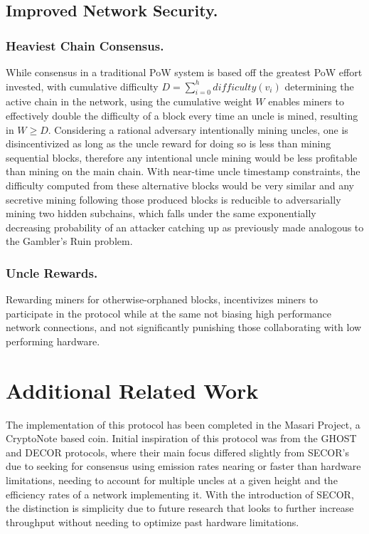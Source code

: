 \documentclass{article}
\begin{document}
\subsection{Improved Network Security.}
\subsubsection{Heaviest Chain Consensus.}
While consensus in a traditional PoW system is based off the greatest PoW effort invested, with cumulative difficulty $D = \sum_{i=0}^{h} difficulty(v_i)$ determining the active chain in the network, using the cumulative weight $W$ enables miners to effectively double the difficulty of a block every time an uncle is mined, resulting in $W \geq D$. Considering a rational adversary intentionally mining uncles, one is disincentivized as long as the uncle reward for doing so is less than mining sequential blocks, therefore any intentional uncle mining would be less profitable than mining on the main chain. With near-time uncle timestamp constraints, the difficulty computed from these alternative blocks would be very similar and any secretive mining following those produced blocks is reducible to adversarially mining two hidden subchains, which falls under the same exponentially decreasing probability of an attacker catching up as previously made analogous to the Gambler's Ruin problem\cite{nakamoto}.

\subsubsection{Uncle Rewards.}
Rewarding miners for otherwise-orphaned blocks, incentivizes miners to participate in the protocol while at the same not biasing high performance network connections, and not significantly punishing those collaborating with low performing hardware.

\section{Additional Related Work}
The implementation of this protocol has been completed in the Masari Project, a CryptoNote based coin. Initial inspiration of this protocol was from the GHOST and DECOR protocols, where their main focus differed slightly from SECOR's due to seeking for consensus using emission rates nearing or faster than hardware limitations, needing to account for multiple uncles at a given height and the efficiency rates of a network implementing it\cite{sompolinsky}\cite{sdlerner}\cite{ethereum}. With the introduction of SECOR, the distinction is simplicity due to future research that looks to further increase throughput without needing to optimize past hardware limitations.
\end{document}
